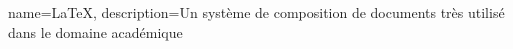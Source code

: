 

{
    name=LaTeX,
    description={Un système de composition de documents très utilisé dans le domaine académique}
}


